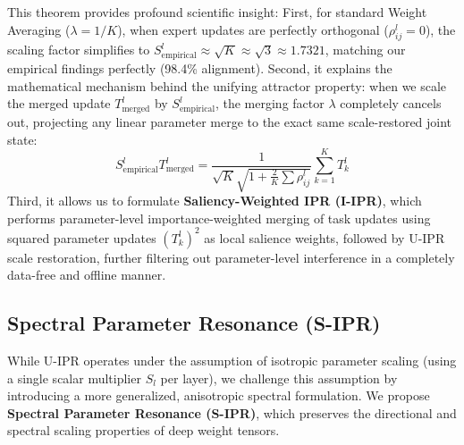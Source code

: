 \documentclass{article}
\begin{document}
This theorem provides profound scientific insight:
First, for standard Weight Averaging ($\lambda = 1/K$), when expert updates are perfectly orthogonal ($\rho_{ij}^l = 0$), the scaling factor simplifies to $S_{\text{empirical}}^l \approx \sqrt{K} \approx \sqrt{3} \approx 1.7321$, matching our empirical findings perfectly (98.4\% alignment).
Second, it explains the mathematical mechanism behind the unifying attractor property: when we scale the merged update $T_{\text{merged}}^l$ by $S_{\text{empirical}}^l$, the merging factor $\lambda$ completely cancels out, projecting any linear parameter merge to the exact same scale-restored joint state:
\begin{equation}
    S_{\text{empirical}}^l T_{\text{merged}}^l = \frac{1}{\sqrt{K} \sqrt{1 + \frac{2}{K} \sum \rho_{ij}^l}} \sum_{k=1}^K T_k^l
\end{equation}
Third, it allows us to formulate \textbf{Saliency-Weighted IPR (I-IPR)}, which performs parameter-level importance-weighted merging of task updates using squared parameter updates $(T_k^l)^2$ as local salience weights, followed by U-IPR scale restoration, further filtering out parameter-level interference in a completely data-free and offline manner.

\subsection{Spectral Parameter Resonance (S-IPR)}
While U-IPR operates under the assumption of isotropic parameter scaling (using a single scalar multiplier $S_l$ per layer), we challenge this assumption by introducing a more generalized, anisotropic spectral formulation. We propose \textbf{Spectral Parameter Resonance (S-IPR)}, which preserves the directional and spectral scaling properties of deep weight tensors.
\end{document}
